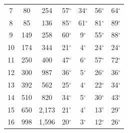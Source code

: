 \documentclass{comjnl}
\providecommand{\DIFaddbeginFL}{} %
\providecommand{\DIFaddendFL}{} %
\newcommand{\DIFaddincludegraphics}[2][]{{\color{blue}\fbox{\DIFOincludegraphics[#1]{#2}}}} %
\DeclareRobustCommand{\DIFaddbeginFL}{\DIFOaddbeginFL \let\includegraphics\DIFaddincludegraphics} %
\DeclareRobustCommand{\DIFaddendFL}{\DIFOaddendFL \let\includegraphics\DIFOincludegraphics} %
\begin{document}
\begin{table}
\begin{adjustbox}{width=1\textwidth}
\begin{tabular}{c|c|c|c|c|c|c}
\rowcolor{gray!30!} 7  & 80  & 254   & 57$^\circ$ & 34$^\circ$ & 56$^\circ$ & 64$^\circ$\\
\rowcolor{gray!00!} 8  & 85  & 136   & 85$^\circ$ & 61$^\circ$ & 81$^\circ$ & 89$^\circ$\\
\rowcolor{gray!30!} 9  & 149 & 258   & 60$^\circ$ & 9$^\circ$  & 55$^\circ$ & 88$^\circ$\\
\rowcolor{gray!00!} 10 & 174 & 344   & 21$^\circ$ & 4$^\circ$  & 24$^\circ$ & 24$^\circ$\\
\rowcolor{gray!30!} 11 & 250 & 400   & 47$^\circ$ & 6$^\circ$  & 57$^\circ$ & 72$^\circ$\\
\rowcolor{gray!00!} 12 & 300 & 987   & 36$^\circ$ & 5$^\circ$  & 26$^\circ$ & 36$^\circ$\\
\rowcolor{gray!30!} 13 & 392 & 562   & 25$^\circ$ & 4$^\circ$  & 22$^\circ$ & 34$^\circ$\\
\rowcolor{gray!00!} 14 & 510 & 820   & 34$^\circ$ & 5$^\circ$  & 30$^\circ$ & 43$^\circ$\\
\rowcolor{gray!30!} 15 & 650 & 2,173 & 21$^\circ$ & 4$^\circ$  & 13$^\circ$ & 29$^\circ$\\
\rowcolor{gray!00!} 16 & 998 & 1,596 & 20$^\circ$ & 3$^\circ$  & 12$^\circ$ & 26$^\circ$\\
\bottomrule
\end{tabular}
\DIFaddbeginFL \end{adjustbox}
\DIFaddendFL \label{tab:gdContest2017}
\end{table}

\end{document}
